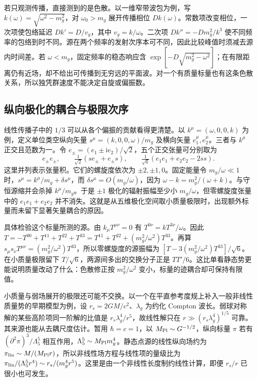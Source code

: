 若只观测传播，直接测到的是色散。以一维窄带波包为例，写 $k(\omega)=\sqrt{\omega^2-m_g^2}$，对 $\omega_0>m_g$ 展开传播相位 $Dk(\omega)$。常数项改变相位，一次项使包络延迟 $Dk'=D/v_g$，其中 $v_g=k/\omega$。二次项 $Dk''=-Dm_g^2/k^3$ 使不同频率的包络到时不同。源在两个频率的发射次序本可不同，因此比较峰值时须减去源内时间差。若 $\omega<m_g$，固定频率的稳态响应含 $\exp[-D\sqrt{m_g^2-\omega^2}]$；在有限距离仍有近场，却不给出可传播到无穷远的平面波。对一个有质量标量也有这条色散关系，所以独凭群速度不能决定自旋或偏振数。

\subsection{纵向极化的耦合与极限次序}

线性传播子中的 $1/3$ 可以从各个偏振的贡献看得更清楚。以 $k^\mu=(\omega,0,0,k)$ 为例，定义单位类空纵向矢量 $s^\mu=(k,0,0,\omega)/m_g$ 及横向矢量 $e_1^\mu,e_2^\mu$。三者与 $k^\mu$ 正交且范数为一。令 $e_\pm=(e_1\pm\mathrm i e_2)/\sqrt2$，五个正交张量可分别取为
\[
 e_\pm e_\pm,\qquad
 \tfrac1{\sqrt2}(s e_\pm+e_\pm s),\qquad
 \tfrac1{\sqrt6}(e_1e_1+e_2e_2-2ss).
\]
这里并列表示张量积。它们的螺旋度依次为 $\pm2,\pm1,0$。固定能量令 $m_g/\omega\ll1$ 时，$s^\mu=k^\mu/m_g+\delta s^\mu$，而 $\delta s^\mu=O(m_g/\omega)$，因为 $\omega-k=m_g^2/(\omega+k)$。与守恒源缩并会杀掉 $k^\mu/m_g$。于是 $\pm1$ 极化的辐射振幅至少小 $m_g/\omega$，但零螺旋度张量中的 $e_1e_1+e_2e_2$ 并不消失。这就是从五维极化空间取小质量极限时，出现额外标量而未留下显著矢量耦合的原因。

具体检验这个标量所测的源。由 $k_\mu T^{\mu\nu}=0$ 有 $T^{0\nu}=kT^{3\nu}/\omega$。因此 $T=-T^{00}+T^{11}+T^{22}+T^{33}=T^{11}+T^{22}+(m_g^2/\omega^2)T^{33}$。再算 $s_\mu s_\nu T^{\mu\nu}=(m_g^2/\omega^2)T^{33}$，所以零螺旋度的源振幅为 $[T-3(m_g^2/\omega^2)T^{33}]/\sqrt6$。在小质量极限留下 $T/\sqrt6$，两源间多出的交换分子正是 $TT'/6$。这比单看静态势更能说明质量改动了什么：色散修正按 $m_g^2/\omega^2$ 变小，标量的迹耦合却可保持有限值。

小质量与弱场展开的极限还可能不交换。以一个在平直参考度规上补入一般非线性质量势的早期模型为例，设 $r_s=2GM/c^2$、$\lambda_g$ 为约化 Compton 波长。弱球对称解的某些高阶项同一阶解的比值是 $r_s\lambda_g^4/r^5$，故线性解只在 $r\gg (r_s\lambda_g^4)^{1/5}$ 可靠。其来源也能从去耦尺度估计。暂用 $\hbar=c=1$，以 $M_{\rm Pl}\sim G^{-1/2}$，纵向标量 $\pi$ 若有 $(\partial^2\pi)^3/\Lambda_5^5$ 相互作用，$\Lambda_5^5\sim M_{\rm Pl}m_g^4$。静态点源的线性纵向场约为 $\pi_{\rm lin}\sim M/(M_{\rm Pl}r)$，所以非线性场方程与线性项的量级比为 $\pi_{\rm lin}/(\Lambda_5^5 r^4)\sim r_s/(m_g^4r^5)$。这里是由一个非线性长度制约线性计算，即便 $r_s/r$ 已很小也可发生。

